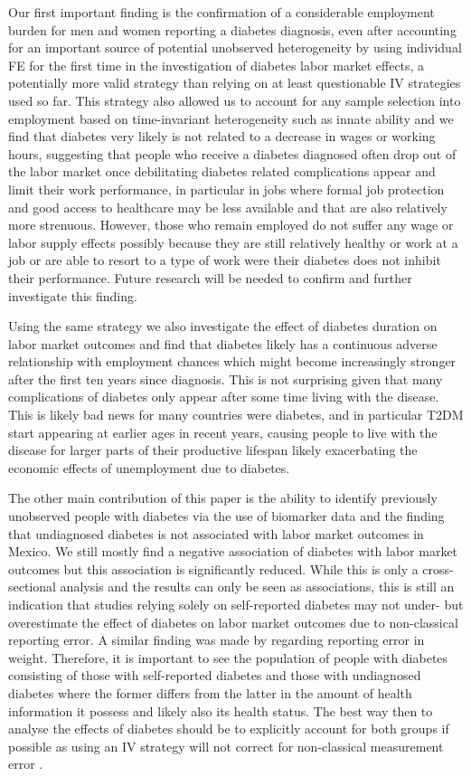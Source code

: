 \documentclass[12pt,english,british]{article}
\begin{document}
Our first important finding is the confirmation of a considerable employment burden for men and women reporting a diabetes diagnosis, even after accounting for an important source of potential unobserved heterogeneity by using individual \ac{FE} for the first time in the investigation of diabetes labor market effects, a potentially more valid strategy than relying on at least questionable \ac{IV} strategies used so far. This strategy also allowed us to account for any sample selection into employment based on time-invariant heterogeneity such as innate ability and we find that diabetes very likely is not related to a decrease in wages or working hours, suggesting that people who receive a diabetes diagnosed often drop out of the labor market once debilitating diabetes related complications appear and limit their work performance, in particular in jobs where formal job protection and good access to healthcare may be less available and that are also relatively more strenuous. However, those who remain employed do not suffer any wage or labor supply effects possibly  because they are still relatively healthy or work at a job or are able to resort to a type of work were their diabetes does not inhibit their performance. Future research will be needed to confirm and further investigate this finding.

Using the same strategy we also investigate the effect of diabetes duration on labor market outcomes and find that diabetes likely has a continuous adverse relationship with employment chances which might become increasingly stronger after the first ten years since diagnosis. This is not surprising given that many complications of diabetes only appear after some time living with the disease. This is likely bad news for many countries were diabetes, and in particular \ac{T2DM} start appearing at earlier ages in recent years, causing people to live with the disease for larger parts of their productive lifespan likely exacerbating the economic effects of unemployment due to diabetes. 

The other main contribution of this paper is the ability to identify previously unobserved people with diabetes via the use of biomarker data and the finding that undiagnosed
diabetes is not associated with labor market outcomes in Mexico. We still mostly find a negative association of diabetes with labor market outcomes but this association is significantly reduced. While this is only a cross-sectional analysis and the results can only be seen as associations, this is still an indication that studies relying solely on self-reported diabetes may not under- but overestimate the effect of diabetes on labor market outcomes due to non-classical reporting error. A similar finding was made by \citet{Cawley2015} regarding reporting error in weight. Therefore, it is important to see the population of people with diabetes consisting of those with self-reported diabetes and those with undiagnosed diabetes where the former differs from the latter in the amount of health information it possess and likely also its health status. The best way then to analyse the effects of diabetes should be to explicitly account for both groups if possible as using an \ac{IV} strategy will not correct for non-classical measurement error \citep{Cawley2015}.
\end{document}
